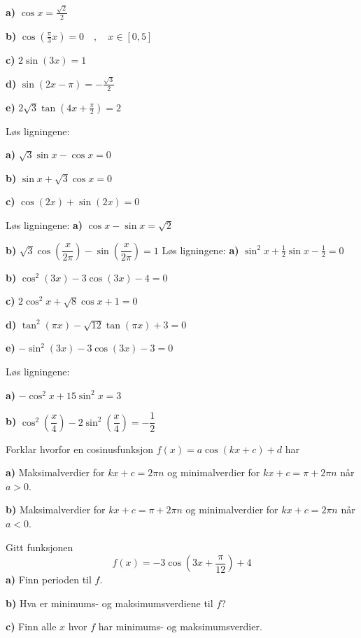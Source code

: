 \textbf{a)} $ \cos x=\frac{\sqrt{2}}{2} $\os

\textbf{b)} $ \cos \left(\frac{\pi}{3}x\right) = 0\quad,\quad x\in[0, 5]$\os

\textbf{c)} $ 2\sin(3x)=1 $\os

\textbf{d)} $ \sin(2x-\pi)=-\frac{\sqrt{3}}{2} $\os

\textbf{e)} $ 2\sqrt{3}\tan \left(4x+\frac{\pi}{2}\right) = 2$ \os

Løs ligningene:\os

\textbf{a)} $\sqrt{3} \sin x - \cos x =0$\os

\textbf{b)} $ \sin x + \sqrt{3}\cos x =0$\os

\textbf{c)} $ \cos (2x) + \sin (2x)=0  $\os


Løs ligningene:\os
\textbf{a)} $ \cos x - \sin x = \sqrt{2}  $ \os

\textbf{b)} $ \sqrt{3} \cos\left(\dfrac{x}{2\pi}\right) - \sin\left(\dfrac{x}{2\pi}\right)=1 $\os
\nes
\newpage
{}
Løs ligningene:\os
\textbf{a)} $ \sin^2 x+\frac{1}{2}\sin x-\frac{1}{2}=0 $\os

\textbf{b)} $ \cos^2 (3x) -3\cos (3x) -4=0$\os

\textbf{c)} $ 2\cos^2 x+ \sqrt{8} \cos x+1=0 $\os

\textbf{d)} $ \tan^2 (\pi x) -\sqrt{12}\tan (\pi x) +  3=0$\os

\textbf{e)} $ -\sin^2(3x)- 3\cos (3x) -3=0$ \os


Løs ligningene:\os

\textbf{a)} $ -\cos^2 x+15\sin^2 x = 3 $ 

\textbf{b)} $ \cos^2 \left(\dfrac{x}{4}\right) - 2 \sin^2 \left(\dfrac{x}{4}\right) = -\dfrac{1}{2} $

\nes
{}	
Forklar hvorfor en cosinusfunksjon $ f(x)=a\cos(kx+c)+d $ har\os

\textbf{a)} Maksimalverdier for $ kx+c= 2\pi n$ og minimalverdier for $ kx+c= \pi + 2\pi n $ når $ a>0 $.\os

\textbf{b)} Maksimalverdier for $ kx+c= \pi+2\pi n$ og minimalverdier for $ kx+c= 2\pi n $ når $ a<0 $. 

Gitt funksjonen 
\[ f(x)=-3\cos\left(3x+\frac{\pi}{12}\right)+4 \]
\textbf{a)} Finn perioden til $ f $.\os

\textbf{b)} Hva er minimums- og maksimumsverdiene til $ f $?\os

\textbf{c)} Finn alle $ x $ hvor $ f $ har minimums- og maksimumsverdier.


